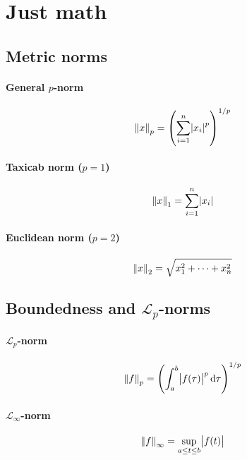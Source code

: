 \section{Just math}

\subsection{Metric norms}
\paragraph{General $p$-norm}
\begin{equation}
	\norm{x}_p
	=
	\left(
		\sum_{i=1}^{n} \abs{x_i}^p
	\right)
	^{1/p}
\end{equation}

\paragraph{Taxicab norm ($p=1$)}
\begin{equation}
	\norm{x}_1
	=
	\sum_{i=1}^{n} \abs{x_i}
\end{equation}

\paragraph{Euclidean norm ($p=2$)}
\begin{equation}
	\norm{x}_2
	=
	\sqrt{x_1^2 + \cdots + x_n^2}
\end{equation}

\subsection[\texorpdfstring{Boundedness and $\mathcal{L}_p$-norms}
	{Boundedness and Lp-norms}]
	{Boundedness and $\mathcal{L}_p$-norms}
\paragraph{$\mathcal{L}_p$-norm}
\begin{equation}
	\norm{f}_p
	=
	\left(
		\int_a^b \abs{f(\tau)}^p \dif \tau
	\right)^{1/p}
\end{equation}

\paragraph{$\mathcal{L}_\infty$-norm}
\begin{equation}
	\norm{f}_\infty
	=
	\sup_{a \leq t \leq b} \abs{f(t)}
\end{equation}

